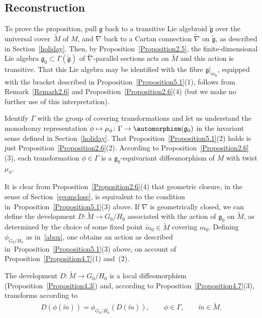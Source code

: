 \subsection{Reconstruction}\label{hutty}

To prove the proposition, pull ${\mathfrak g} $ back to a transitive
Lie algebroid $\tilde {\mathfrak g} $ over the universal cover~$\tilde
M$ of $M$, and $\nabla $ back to a Cartan connection $\tilde \nabla $
on $\tilde {\mathfrak g}$, as described in Section~\ref{holiday}. Then, by
Proposition~\ref{Proposition2.5}, the f\/inite-dimensional Lie algebra
${\mathfrak g}_0 \subset \Gamma(\tilde {\mathfrak g})$ of $\tilde
\nabla $-parallel sections acts on $\tilde M$ and this action is
transitive. That this Lie algebra may be identif\/ied with the f\/ibre
${\mathfrak g}|_{m_0}$, equipped with the bracket described in Proposition~\ref{Proposition5.1}(1),
follows from Remark~\ref{Remark2.6} and Proposition~\ref{Proposition2.6}(4)
(but we make no further use of this
interpretation).

Identify $\Gamma$ with the group of covering transformations and let
us understand the monodromy representation $\phi \mapsto \mu_\phi
\colon \Gamma \rightarrow \automorphism ({\mathfrak g}_0)$ in the
invariant sense def\/ined in Section~\ref{holiday}. That Proposition~\ref{Proposition5.1}(2) %
holds is
just Proposition~\ref{Proposition2.6}(2).
According to Proposition~\ref{Proposition2.6}(3),
each transformation $\phi \in \Gamma $ is a
${\mathfrak g}_0$-equivariant dif\/feomorphism of $M$ with twist
$\mu_\phi$.

It is clear from Proposition~\ref{Proposition2.6}(4)
that geometric
closure, in the sense of Section~\ref{geomclose}, is equivalent to the
condition in~Proposition~\ref{Proposition5.1}(3) %
above. If $\nabla $ is geometrically closed,
we can def\/ine the development $D \colon \tilde M \rightarrow
{G_0/H_0}$ associated with the action of ${\mathfrak g}_0$ on $\tilde
M$, as determined by the choice of some f\/ixed point $\tilde m_0 \in
\tilde M$ covering $m_0$. Def\/ining $\phi_{G_0/H_0} $ as in~\eqref{abox},
 one obtains an action as described in~Proposition~\ref{Proposition5.1}(3) %
above, on account of Proposition~\ref{Proposition4.7}(1) and~(2).  %

The development $D \colon \tilde M \rightarrow {G_0/H_0} $ is a local
dif\/feomorphism (Proposition~\ref{Proposition4.3}) %
and, according to
Proposition~\ref{Proposition4.7}(3), %
transforms according to
\begin{gather}
  D(\phi(\tilde m))=\phi_{G_0/H_0} (D(\tilde m)),
  \qquad \phi \in \Gamma,\qquad \tilde m \in \tilde M.  \label{cvg}
\end{gather}

